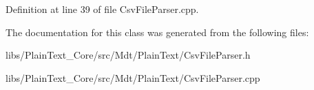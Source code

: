 Definition at line 39 of file Csv\+File\+Parser.\+cpp.



The documentation for this class was generated from the following files\+:\begin{DoxyCompactItemize}
\item 
libs/\+Plain\+Text\+\_\+\+Core/src/\+Mdt/\+Plain\+Text/Csv\+File\+Parser.\+h\item 
libs/\+Plain\+Text\+\_\+\+Core/src/\+Mdt/\+Plain\+Text/Csv\+File\+Parser.\+cpp\end{DoxyCompactItemize}
